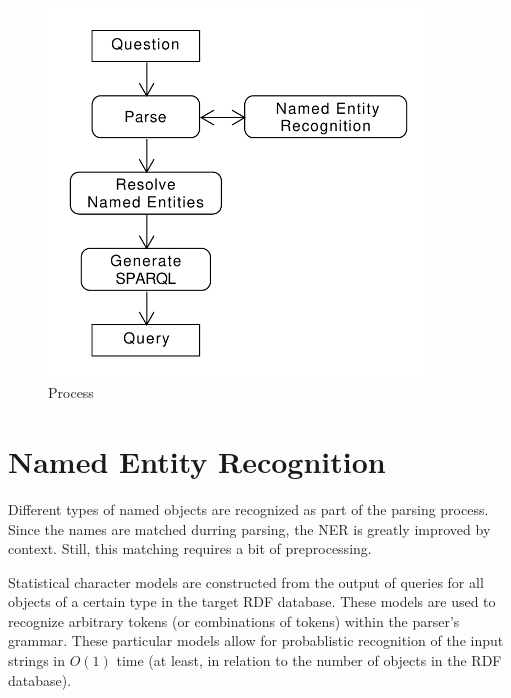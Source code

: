 \documentclass[11pt]{article}
\begin{document}
\begin{figure}[h!]
    \centering
    \includegraphics[width=0.9\textwidth,natwidth=1,natheight=1]{usage.pdf}
    \caption{Process}
    \label{fig:process}
\end{figure}

\section{Named Entity Recognition}
Different types of named objects are recognized as part of the parsing process.
Since the names are matched durring parsing, the NER is greatly improved by context.
Still, this matching requires a bit of preprocessing.

Statistical character models are constructed from the output of queries for all 
objects of a certain type in the target RDF database. 
These models are used to recognize arbitrary tokens (or combinations of 
tokens) within the parser's grammar. 
These particular models allow for probablistic recognition of the input strings in 
$O(1)$ time (at least, in relation to the number of objects in the RDF
database). 

%
\end{document}

